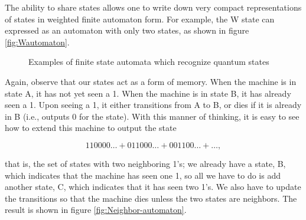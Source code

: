 \documentclass[12pt]{amsbook}
\theoremstyle{plain}
\theoremstyle{definition}
\theoremstyle{remark}
\begin{document}
The ability to share states allows one to write down very compact
 representations of states in weighted finite automaton form.  For example, the W state can expressed as an automaton with only two states, as shown in figure \ref{fig:Wautomaton}.

\begin{figure}
\caption{Examples of finite state automata which recognize quantum states}
\end{figure}

Again, observe that our states act as a form of memory.  When the machine is in state A, it has not yet seen a 1.  When the machine is in state B, it has already seen a 1.  Upon seeing a 1, it either transitions from A to B, or dies if it is already in B (i.e., outputs 0 for the state).  With this manner of thinking, it is easy to see how to extend this machine to output the state

$$110000\dots + 011000\dots + 001100\dots + \dots,$$

\noindent that is, the set of states with two neighboring 1's;  we already have a state, B, which indicates that the machine has seen one 1, so all we have to do is add another state, C, which indicates that it has seen two 1's.  We also have to update the transitions so that the machine dies unless the two states are neighbors.  The result is shown in figure \ref{fig:Neighbor-automaton}.
\end{document}
